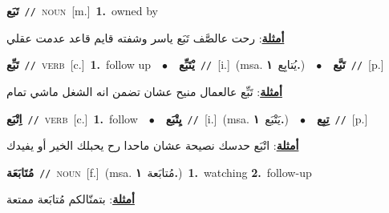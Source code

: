 \documentclass[10pt,a4paper,twoside]{article} %
\begin{document}
\begin{multicols}{2}
{{\setlength\topsep{0pt}\textbf{\foreignlanguage{arabic}{تَبَع}}\ {\color{gray}\texttt{//}\color{black}}\ \textsc{noun}\ [m.]\ \textbf{1.}~owned by\  \begin{flushright}\color{gray}\foreignlanguage{arabic}{\textbf{\underline{\foreignlanguage{arabic}{أمثلة}}}: رحت عالصَّف تَبَع ياسر وشفته قايم قاعد عدمت عقلي}\end{flushright}\color{black}} \vspace{2mm}

{\setlength\topsep{0pt}\textbf{\foreignlanguage{arabic}{تَبِّع}}\ {\color{gray}\texttt{//}\color{black}}\ \textsc{verb}\ [c.]\ \textbf{1.}~follow up\ \ $\bullet$\ \ \setlength\topsep{0pt}\textbf{\foreignlanguage{arabic}{يْتَبِّع}}\ {\color{gray}\texttt{//}\color{black}}\ [i.]\ \color{gray}(msa. \foreignlanguage{arabic}{يُتابِع}~\foreignlanguage{arabic}{\textbf{١.}})\color{black}\ \ $\bullet$\ \ \setlength\topsep{0pt}\textbf{\foreignlanguage{arabic}{تَبَّع}}\ {\color{gray}\texttt{//}\color{black}}\ [p.]\  \begin{flushright}\color{gray}\foreignlanguage{arabic}{\textbf{\underline{\foreignlanguage{arabic}{أمثلة}}}: تَبِّع عالعمال منيح عشان تضمن انه الشغل ماشي تمام}\end{flushright}\color{black}} \vspace{2mm}

{\setlength\topsep{0pt}\textbf{\foreignlanguage{arabic}{اِتْبَع}}\ {\color{gray}\texttt{//}\color{black}}\ \textsc{verb}\ [c.]\ \textbf{1.}~follow\ \ $\bullet$\ \ \setlength\topsep{0pt}\textbf{\foreignlanguage{arabic}{يِتْبَع}}\ {\color{gray}\texttt{//}\color{black}}\ [i.]\ \color{gray}(msa. \foreignlanguage{arabic}{يَتْبَع}~\foreignlanguage{arabic}{\textbf{١.}})\color{black}\ \ $\bullet$\ \ \setlength\topsep{0pt}\textbf{\foreignlanguage{arabic}{تِبِع}}\ {\color{gray}\texttt{//}\color{black}}\ [p.]\  \begin{flushright}\color{gray}\foreignlanguage{arabic}{\textbf{\underline{\foreignlanguage{arabic}{أمثلة}}}: اتْبَع حدسك نصيحة عشان ماحدا رح يحبلك الخير أو يفيدك}\end{flushright}\color{black}} \vspace{2mm}

{\setlength\topsep{0pt}\textbf{\foreignlanguage{arabic}{مُتَابَعَة}}\ {\color{gray}\texttt{//}\color{black}}\ \textsc{noun}\ [f.]\ \color{gray}(msa. \foreignlanguage{arabic}{مُتابَعة}~\foreignlanguage{arabic}{\textbf{١.}})\color{black}\ \textbf{1.}~watching  \textbf{2.}~follow-up\  \begin{flushright}\color{gray}\foreignlanguage{arabic}{\textbf{\underline{\foreignlanguage{arabic}{أمثلة}}}: بتمنّالكم مُتابَعة ممتعة}\end{flushright}\color{black}} \vspace{2mm}

}
\end{multicols}
\end{document}
